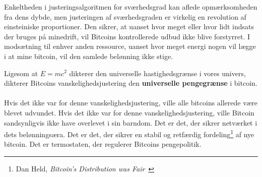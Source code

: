 \documentclass[paper=6in:9in,pagesize=pdftex,
               headinclude=on,footinclude=on,12pt]{scrbook}
\begin{document}
Enkeltheden i justeringsalgoritmen for sværhedsgrad kan aflede opmærksomheden fra dens dybde, men justeringen af sværhedsgraden er virkelig en revolution af einsteiniske proportioner. Den sikrer, at uanset hvor meget eller hvor lidt indsats der bruges på minedrift, vil Bitcoins kontrollerede udbud ikke blive forstyrret. I modsætning til enhver anden ressource, uanset hvor meget energi nogen vil lægge i at mine bitcoin, vil den samlede belønning ikke stige.

Ligesom at $E=mc^2$ dikterer den universelle hastighedsgrænse i vores univers, dikterer Bitcoins vanskelighedsjustering den \textbf{universelle pengegrænse} i bitcoin.\paragraph{} Hvis det ikke var for denne vanskelighedsjustering, ville alle bitcoins allerede være blevet udvundet. Hvis det ikke var for denne vanskelighedsjustering, ville Bitcoin sandsynligvis ikke have overlevet i sin barndom. Det er det, der sikrer netværket i dets belønningsæra. Det er det, der sikrer en stabil og retfærdig fordeling\footnote{Dan Held, \textit{Bitcoin's Distribution was Fair}~\cite{distribution-was-fair}} af nye bitcoin. Det er termostaten, der regulerer Bitcoins pengepolitik.
\end{document}
